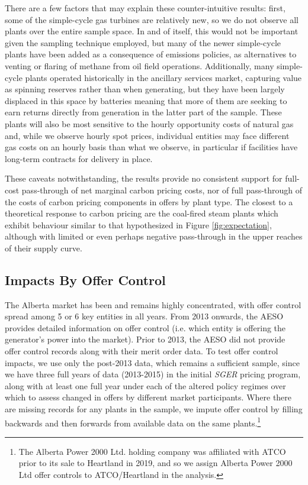 \documentclass[12pt]{article}
\newcommand{\SGER}{\textit{SGER} }
\begin{document}

There are a few factors that may explain these counter-intuitive results: first, some of the simple-cycle gas turbines are relatively new, so we do not observe all plants over the entire sample space. In and of itself, this would not be important given the sampling technique employed, but many of the newer simple-cycle plants have been added as a consequence of emissions policies, as alternatives to venting or flaring of methane from oil field operations. Additionally, many simple-cycle plants operated historically in the ancillary services market, capturing value as spinning reserves rather than when generating, but they have been largely displaced in this space by batteries meaning that more of them are seeking to earn returns directly from generation in the latter part of the sample. These plants will also be most sensitive to the hourly opportunity costs of natural gas and, while we observe hourly spot prices, individual entities may face different gas costs on an hourly basis than what we observe, in particular if facilities have long-term contracts for delivery in place.

These caveats notwithstanding, the results provide no consistent support for full-cost pass-through of net marginal carbon pricing costs, nor of full pass-through of the costs of carbon pricing components in offers by plant type. The closest to a theoretical response to carbon pricing are the coal-fired steam plants which exhibit behaviour similar to that hypothesized in Figure \ref{fig:expectation}, although with limited or even perhaps negative pass-through in the upper reaches of their supply curve.

\subsection{Impacts By Offer Control}
The Alberta market has been and remains highly concentrated, with offer control spread among 5 or 6 key entities in all years. From 2013 onwards, the AESO provides detailed information on offer control (i.e. which entity is offering the generator's power into the market). Prior to 2013, the AESO did not provide offer control records along with their merit order data. To test offer control impacts, we use only the post-2013 data, which remains a sufficient sample, since we have three full years of data (2013-2015) in the initial \SGER pricing program, along with at least one full year under each of the altered policy regimes over which to assess changed in offers by different market participants. Where there are missing records for any plants in the sample, we impute offer control by filling backwards and then forwards from available data on the same plants.\footnote{The Alberta Power 2000 Ltd. holding company was affiliated with ATCO prior to its sale to Heartland in 2019, and so we assign Alberta Power 2000 Ltd offer controls to ATCO/Heartland in the analysis.}
\end{document}
